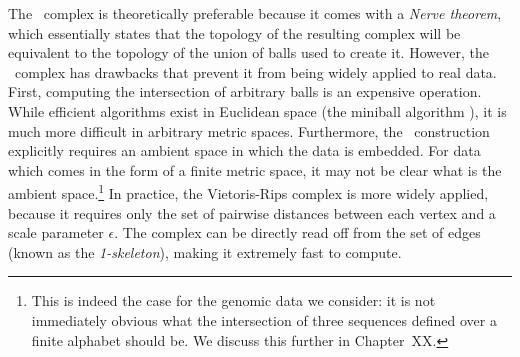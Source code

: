 The \Cech\ complex is theoretically preferable because it comes with a \emph{Nerve theorem}, which essentially states that the topology of the resulting complex will be equivalent to the topology of the union of balls used to create it.
However, the \Cech\ complex has drawbacks that prevent it from being widely applied to real data.
First, computing the intersection of arbitrary balls is an expensive operation.
While efficient algorithms exist in Euclidean space (the miniball algorithm \cite{Gartner:1999}), it is much more difficult in arbitrary metric spaces.
Furthermore, the \Cech\ construction explicitly requires an ambient space in which the data is embedded.
For data which comes in the form of a finite metric space, it may not be clear what is the ambient space.\footnote{This is indeed the case for the genomic data we consider: it is not immediately obvious what the intersection of three sequences defined over a finite alphabet should be. We discuss this further in Chapter~XX.}
In practice, the Vietoris-Rips complex is more widely applied, because it requires only the set of pairwise distances between each vertex and a scale parameter $\epsilon$.
The complex can be directly read off from the set of edges (known as the \emph{1-skeleton}), making it extremely fast to compute.

